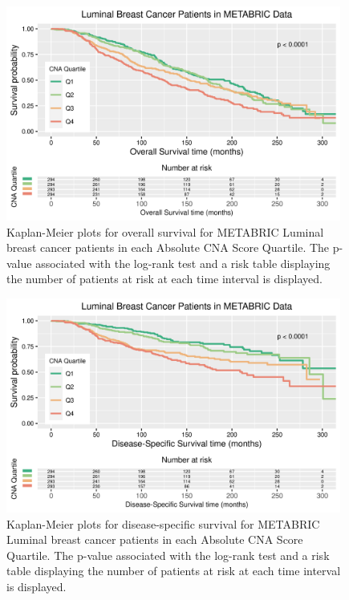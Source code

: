 \begin{figure}[!h]
\centering
\includegraphics[width=0.98\textwidth]{../figures/Chapter_3/Luminal_AB_Score_OS.png}
\caption[Kaplan-Meier plots for overall survival for METABRIC Luminal breast cancer patients in each Absolute CNA Score Quartile.]{Kaplan-Meier plots for overall survival for METABRIC Luminal breast cancer patients in each Absolute CNA Score Quartile. The p-value associated with the log-rank test and a risk table displaying the number of patients at risk at each time interval is displayed.}
\label{fig:OS-Survival-Luminal}
\end{figure}


\begin{figure}[!h]
\centering
\includegraphics[width=0.98\textwidth]{../figures/Chapter_3/Luminal_AB_Score_DSS.png}
\caption[Kaplan-Meier plots for disease-specific survival for METABRIC Luminal breast cancer patients in each Absolute CNA Score Quartile.]{Kaplan-Meier plots for disease-specific survival for METABRIC Luminal breast cancer patients in each Absolute CNA Score Quartile. The p-value associated with the log-rank test and a risk table displaying the number of patients at risk at each time interval is displayed.}
\label{fig:DSS-Survival-Luminal}
\end{figure}

